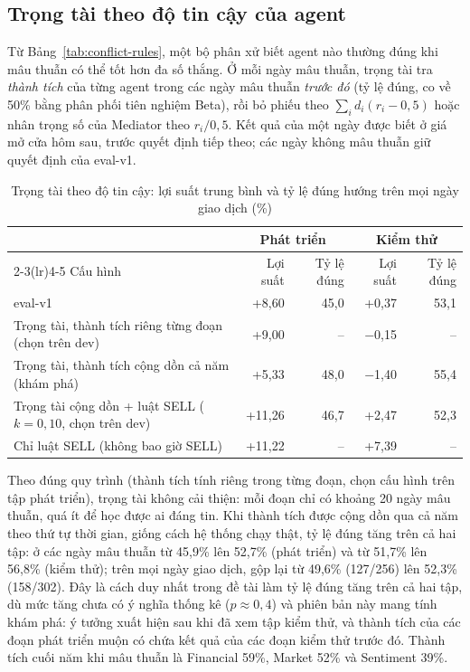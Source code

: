 \subsection{Trọng tài theo độ tin cậy của agent}
\label{sec:arbiter}
Từ Bảng~\ref{tab:conflict-rules}, một bộ phân xử biết agent nào thường đúng khi mâu thuẫn có thể tốt hơn đa số thắng.
Ở mỗi ngày mâu thuẫn, trọng tài tra \emph{thành tích} của từng agent trong các ngày mâu thuẫn \emph{trước đó} (tỷ lệ đúng,
co về 50\% bằng phân phối tiên nghiệm Beta), rồi bỏ phiếu theo $\sum_i d_i(r_i-0{,}5)$ hoặc nhân trọng số của Mediator
theo $r_i/0{,}5$. Kết quả của một ngày được biết ở giá mở cửa hôm sau, trước quyết định tiếp theo; các ngày không mâu
thuẫn giữ quyết định của eval-v1.

\begin{table}[H]
\centering
\caption{Trọng tài theo độ tin cậy: lợi suất trung bình và tỷ lệ đúng hướng trên mọi ngày giao dịch (\%)}
\label{tab:arbiter}
\small
\begin{tabular}{lrrrr}
\toprule
 & \multicolumn{2}{c}{Phát triển} & \multicolumn{2}{c}{Kiểm thử} \\
\cmidrule(lr){2-3}\cmidrule(lr){4-5}
Cấu hình & Lợi suất & Tỷ lệ đúng & Lợi suất & Tỷ lệ đúng \\
\midrule
eval-v1 & +8,60 & 45,0 & +0,37 & 53,1 \\
Trọng tài, thành tích riêng từng đoạn (chọn trên dev) & +9,00 & -- & $-$0,15 & -- \\
Trọng tài, thành tích cộng dồn cả năm (khám phá) & +5,33 & 48,0 & $-$1,40 & 55,4 \\
Trọng tài cộng dồn + luật SELL ($k=0{,}10$, chọn trên dev) & +11,26 & 46,7 & +2,47 & 52,3 \\
Chỉ luật SELL (không bao giờ SELL) & +11,22 & -- & +7,39 & -- \\
\bottomrule
\end{tabular}
\end{table}

Theo đúng quy trình (thành tích tính riêng trong từng đoạn, chọn cấu hình trên tập phát triển), trọng tài không cải
thiện: mỗi đoạn chỉ có khoảng 20 ngày mâu thuẫn, quá ít để học được ai đáng tin. Khi thành tích được cộng dồn qua cả năm
theo thứ tự thời gian, giống cách hệ thống chạy thật, tỷ lệ đúng tăng trên cả hai tập: ở các ngày mâu thuẫn từ 45,9\%
lên 52,7\% (phát triển) và từ 51,7\% lên 56,8\% (kiểm thử); trên mọi ngày giao dịch, gộp lại từ 49,6\% (127/256) lên
52,3\% (158/302). Đây là cách duy nhất trong đề tài làm tỷ lệ đúng tăng trên cả hai tập, dù mức tăng chưa có ý nghĩa
thống kê ($p\approx0{,}4$) và phiên bản này mang tính khám phá: ý tưởng xuất hiện sau khi đã xem tập kiểm thử, và thành
tích của các đoạn phát triển muộn có chứa kết quả của các đoạn kiểm thử trước đó. Thành tích cuối năm khi mâu thuẫn là
Financial 59\%, Market 52\% và Sentiment 39\%.

